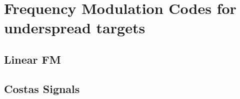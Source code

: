 \chapter{Frequency Modulation Codes for underspread targets}

\section{Linear FM}

\section{Costas Signals}

